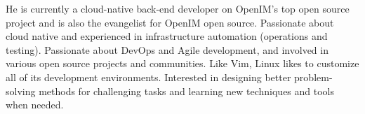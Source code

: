 

\begin{cvparagraph}

He is currently a cloud-native back-end developer on OpenIM’s top open source project and is also the evangelist for OpenIM open source. Passionate about cloud native and experienced in infrastructure automation (operations and testing). Passionate about DevOps and Agile development, and involved in various open source projects and communities. Like Vim, Linux likes to customize all of its development environments. Interested in designing better problem-solving methods for challenging tasks and learning new techniques and tools when needed.



\end{cvparagraph}
